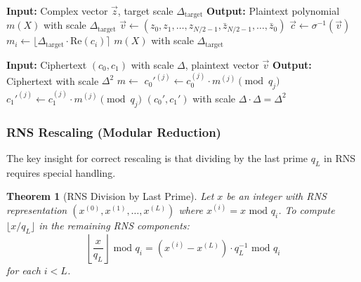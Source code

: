 \documentclass[11pt,a4paper]{article}
\newtheorem{theorem}{Theorem}
\newcommand{\bmod}{\text{ mod }}
\begin{document}
\begin{algorithm}[H]
\caption{Encode at Specific Scale}
\begin{algorithmic}[1]
    \State \textbf{Input:} Complex vector $\vec{z}$, target scale $\Delta_{\text{target}}$
    \State \textbf{Output:} Plaintext polynomial $m(X)$ with scale $\Delta_{\text{target}}$
    \State
    \State {}
    \State $\vec{v} \gets (z_0, z_1, \ldots, z_{N/2-1}, \bar{z}_{N/2-1}, \ldots, \bar{z}_0)$
    \State $\vec{c} \gets \sigma^{-1}(\vec{v})$ 
        \State $m_i \gets \lfloor \Delta_{\text{target}} \cdot \text{Re}(c_i) \rceil$
    \EndFor
    \State \Return $m(X)$ with scale $\Delta_{\text{target}}$
\EndFunction
\end{algorithmic}
\end{algorithm}

\begin{algorithm}[H]
\caption{Evaluate Plaintext Multiplication (EvalMultPlain)}
\begin{algorithmic}[1]
    \State \textbf{Input:} Ciphertext $(c_0, c_1)$ with scale $\Delta$, plaintext vector $\vec{v}$
    \State \textbf{Output:} Ciphertext with scale $\Delta^2$
    \State
    \State {}
    \State $m \gets$ 
    \State
    \State {}
        \State $c_0'^{(j)} \gets c_0^{(j)} \cdot m^{(j)} \pmod{q_j}$
        \State $c_1'^{(j)} \gets c_1^{(j)} \cdot m^{(j)} \pmod{q_j}$
    \EndFor
    \State
    \State \Return $(c_0', c_1')$ with scale $\Delta \cdot \Delta = \Delta^2$
\EndFunction
\end{algorithmic}
\end{algorithm}

\subsubsection{RNS Rescaling (Modular Reduction)}

The key insight for correct rescaling is that dividing by the last prime $q_L$ in RNS requires special handling.

\begin{theorem}[RNS Division by Last Prime]
Let $x$ be an integer with RNS representation $(x^{(0)}, x^{(1)}, \ldots, x^{(L)})$ where $x^{(i)} = x \bmod q_i$. To compute $\lfloor x / q_L \rfloor$ in the remaining RNS components:
\[
\left\lfloor \frac{x}{q_L} \right\rfloor \bmod q_i = (x^{(i)} - x^{(L)}) \cdot q_L^{-1} \bmod q_i
\]
for each $i < L$.
\end{theorem}
\end{document}
